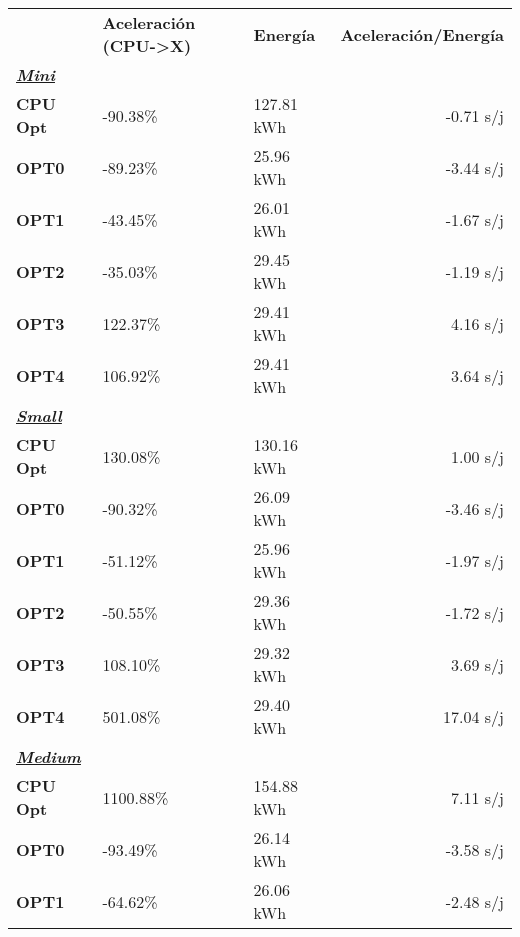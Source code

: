 \begin{table}[H]
    \centering
    \begin{tabular}{lllr}
    \rowcolor[HTML]{DAE8FC} \ & \textbf{Aceleración (CPU->X)} & \textbf{	Energía} & \textbf{	Aceleración/Energía} \\
    \cellcolor[HTML]{DAE8FC} \textbf{\textbf{{\emph{{\underline{{Mini}}}}}}} & &	&	 \\
    \rowcolor[HTML]{EFEFEF} \cellcolor[HTML]{DAE8FC} \textbf{CPU Opt} &-90.38\%  &	127.81 kWh  &	-0.71 s/j \\
    \cellcolor[HTML]{DAE8FC} \textbf{OPT0} & -89.23\%  &	25.96 kWh  &	-3.44 s/j \\
    \rowcolor[HTML]{EFEFEF} \cellcolor[HTML]{DAE8FC} \textbf{OPT1} &-43.45\%  &	26.01 kWh  &	-1.67 s/j \\
    \cellcolor[HTML]{DAE8FC} \textbf{OPT2} & -35.03\%  &	29.45 kWh  &	-1.19 s/j \\
    \rowcolor[HTML]{EFEFEF} \cellcolor[HTML]{DAE8FC} \textbf{OPT3} &122.37\%  &	29.41 kWh  &	4.16 s/j \\
    \cellcolor[HTML]{DAE8FC} \textbf{OPT4} & 106.92\%  &	29.41 kWh  &	3.64 s/j \\
    \rowcolor[HTML]{EFEFEF} \cellcolor[HTML]{DAE8FC} \textbf{\textbf{{\emph{{\underline{{Small}}}}}}} &&	&	 \\
    \cellcolor[HTML]{DAE8FC} \textbf{CPU Opt} & 130.08\%  &	130.16 kWh  &	1.00 s/j \\
    \rowcolor[HTML]{EFEFEF} \cellcolor[HTML]{DAE8FC} \textbf{OPT0} &-90.32\%  &	26.09 kWh  &	-3.46 s/j \\
    \cellcolor[HTML]{DAE8FC} \textbf{OPT1} & -51.12\%  &	25.96 kWh  &	-1.97 s/j \\
    \rowcolor[HTML]{EFEFEF} \cellcolor[HTML]{DAE8FC} \textbf{OPT2} &-50.55\%  &	29.36 kWh  &	-1.72 s/j \\
    \cellcolor[HTML]{DAE8FC} \textbf{OPT3} & 108.10\%  &	29.32 kWh  &	3.69 s/j \\
    \rowcolor[HTML]{EFEFEF} \cellcolor[HTML]{DAE8FC} \textbf{OPT4} &501.08\%  &	29.40 kWh  &	17.04 s/j \\
    \cellcolor[HTML]{DAE8FC} \textbf{\textbf{{\emph{{\underline{{Medium}}}}}}} & &	&	 \\
    \rowcolor[HTML]{EFEFEF} \cellcolor[HTML]{DAE8FC} \textbf{CPU Opt} &1100.88\%  &	154.88 kWh  &	7.11 s/j \\
    \cellcolor[HTML]{DAE8FC} \textbf{OPT0} & -93.49\%  &	26.14 kWh  &	-3.58 s/j \\
    \rowcolor[HTML]{EFEFEF} \cellcolor[HTML]{DAE8FC} \textbf{OPT1} &-64.62\%  &	26.06 kWh  &	-2.48 s/j \\

\end{tabular}
\end{table}
